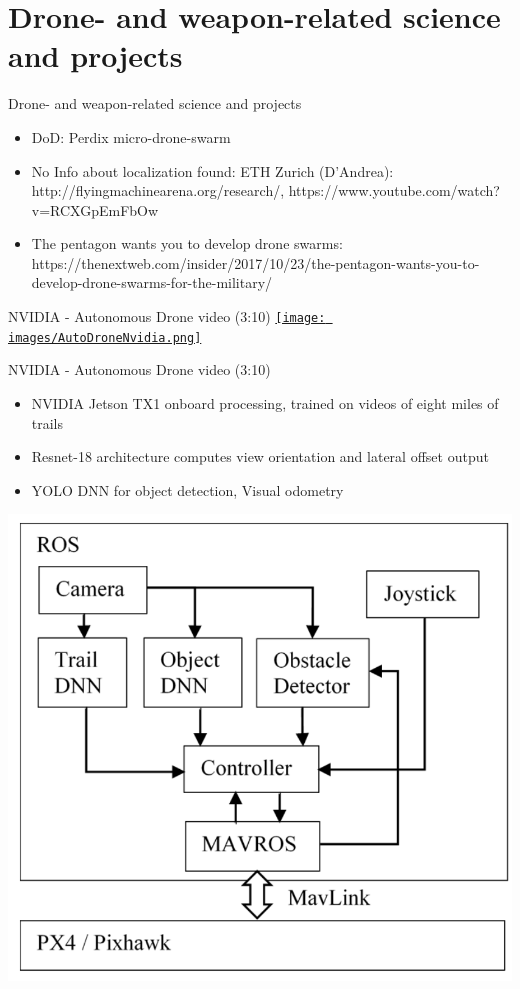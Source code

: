 \documentclass[aspectratio=169]{beamer}
\begin{document}
\section{Drone- and weapon-related science and projects}
\begin{frame}{Drone- and weapon-related science and projects}
	\begin{itemize}
		\item DoD: Perdix micro-drone-swarm
		\item No Info about localization found: ETH Zurich (D'Andrea): http://flyingmachinearena.org/research/, https://www.youtube.com/watch?v=RCXGpEmFbOw
        \item The pentagon wants you to develop drone swarms: https://thenextweb.com/insider/2017/10/23/the-pentagon-wants-you-to-develop-drone-swarms-for-the-military/
	\end{itemize}
\end{frame}

\begin{frame}{NVIDIA - Autonomous Drone video (3:10)}
        	\centering
            \href{run:./videos/AutoDroneNvidia.mp4?autostart}
            {\texttt{[image: images/AutoDroneNvidia.png]}}
\end{frame}

\begin{frame}{NVIDIA - Autonomous Drone video (3:10)}
	\begin{itemize}
		\item NVIDIA Jetson TX1 onboard processing, trained on videos of eight miles of trails
		\item Resnet-18 architecture computes view orientation and lateral offset output
		\item YOLO DNN for object detection, Visual odometry
	\end{itemize}
	\centering
	\includegraphics[width=.4\textwidth]{images/nvidia_controller.png}
	
	\tiny{\color{gray}{https://arxiv.org/pdf/1705.02550.pdf}}
	
\end{frame}
\end{document}
